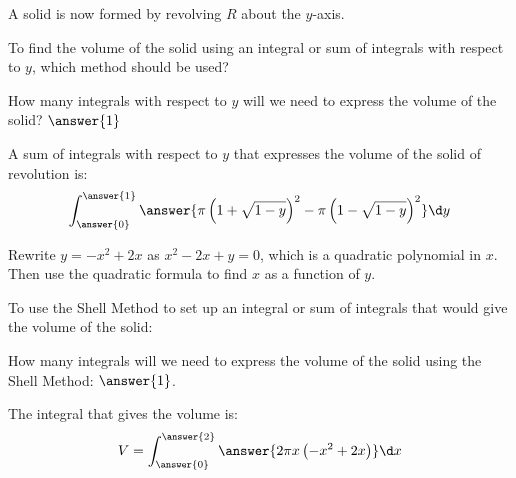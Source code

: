 \documentclass{ximera}
\begin{document}
A solid is now formed by revolving $R$ about the $y$-axis.

To find the volume of the solid using an integral or sum of integrals with respect to $y$, which method should be used?

  \begin{multipleChoice}
  \end{multipleChoice}

How many integrals with respect to $y$ will we need to express the volume of the solid? $\answer{1}$


\begin{exercise}

A sum of integrals with respect to $y$ that expresses the volume of the solid of revolution is: 
\[
\int_{\answer{0}}^{\answer{1}} \answer{\pi \left( 1+\sqrt{1-y} \right)^{2} - \pi \left(1 -\sqrt{1-y} \right)^{2}} \d y
\]
\begin{hint}
Rewrite $y=-x^{2}+2x$ as $x^{2}-2x+y=0$, which is a quadratic polynomial in $x$. Then use the quadratic formula to find $x$ as a function of $y$. 
\end{hint}

\end{exercise}

To use the Shell Method to set up an integral or sum of integrals that would give the volume of the solid: 

  \begin{multipleChoice}
  \end{multipleChoice}

How many integrals will we need to express the volume of the solid using the Shell Method: $\answer{1}$. 


\begin{exercise} 
The integral that gives the volume is: 
\[
V=\int_{\answer{0}}^{\answer{2}} \answer{ 2\pi x \left(-x^{2}+2x \right)} \d x
\] 


\end{exercise}
\end{document}
